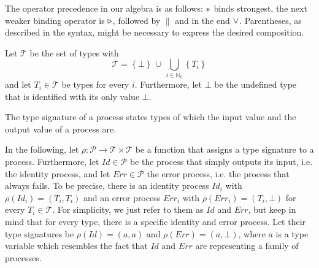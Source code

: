 \begin{definition}
\label{def:operator_precedence}
The operator precedence in our algebra is as follows: $*$ binds strongest, the next weaker binding operator is $\triangleright$, followed by $\parallel$ and in the end $\vee$. Parentheses, as described in the syntax, might be necessary to express the desired composition.

\hfill\qedsymbol
\end{definition}

\begin{definition}
Let $\mathcal{T}$ be the set of types with
\begin{equation}
  \mathcal{T} = \left\{ \bot \right\} \, \cup \, \bigcup_{i \in \mathbb{N}_0} \left\{ T_i \right\}
\end{equation}
and let $T_i \in \mathcal{T}$ be types for every $i$. Furthermore, let $\bot$ be the undefined type that is identified with its only value $\bot$.

\hfill\qedsymbol
\end{definition}


\begin{definition}
\label{def:type_signature}
The type signature of a process states types of which the input value and the output value of a process are.

\hfill\qedsymbol
\end{definition}

In the following, let $\rho \colon \mathcal{P} \to \mathcal{T} \times \mathcal{T}$ be a function that assigns a type signature to a process. Furthermore, let $Id \in \mathcal{P}$ be the process that simply outputs its input, i.e. the identity process, and let $Err \in \mathcal{P}$ the error process, i.e. the process that always fails. To be precise, there is an identity process $Id_i$ with $\rho \left( Id_i \right) = \left( T_i, T_i \right)$ and an error process $Err_i$ with $\rho \left( Err_i \right) = \left( T_i, \bot \right)$ for every $T_i \in \mathcal{T}$. For simplicity, we just refer to them as $Id$ and $Err$, but keep in mind that for every type, there is a specific identity and error process. Let their type signatures be $\rho \left( Id \right) = \left( a, a \right)$ and $\rho \left( Err \right) = \left( a, \bot \right)$, where $a$ is a type variable which resembles the fact that $Id$ and $Err$ are representing a family of processes.

